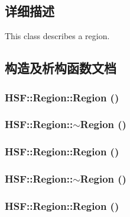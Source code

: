 \subsection{详细描述}
This class describes a region. 

\subsection{构造及析构函数文档}
\hypertarget{classHSF_1_1Region_aa31738c265f5192d61a8a7b8f89c972a}{
\subsubsection[{Region}]{\setlength{\rightskip}{0pt plus 5cm}HSF::Region::Region ()}}
\label{classHSF_1_1Region_aa31738c265f5192d61a8a7b8f89c972a}
\hypertarget{classHSF_1_1Region_addfd3a382c30688582a760a25a2d8cbc}{
\subsubsection[{$\sim$Region}]{\setlength{\rightskip}{0pt plus 5cm}HSF::Region::$\sim$Region ()}}
\label{classHSF_1_1Region_addfd3a382c30688582a760a25a2d8cbc}
\hypertarget{classHSF_1_1Region_aa31738c265f5192d61a8a7b8f89c972a}{
\subsubsection[{Region}]{\setlength{\rightskip}{0pt plus 5cm}HSF::Region::Region ()}}
\label{classHSF_1_1Region_aa31738c265f5192d61a8a7b8f89c972a}
\hypertarget{classHSF_1_1Region_addfd3a382c30688582a760a25a2d8cbc}{
\subsubsection[{$\sim$Region}]{\setlength{\rightskip}{0pt plus 5cm}HSF::Region::$\sim$Region ()}}
\label{classHSF_1_1Region_addfd3a382c30688582a760a25a2d8cbc}
\hypertarget{classHSF_1_1Region_aa31738c265f5192d61a8a7b8f89c972a}{
\subsubsection[{Region}]{\setlength{\rightskip}{0pt plus 5cm}HSF::Region::Region ()}}
